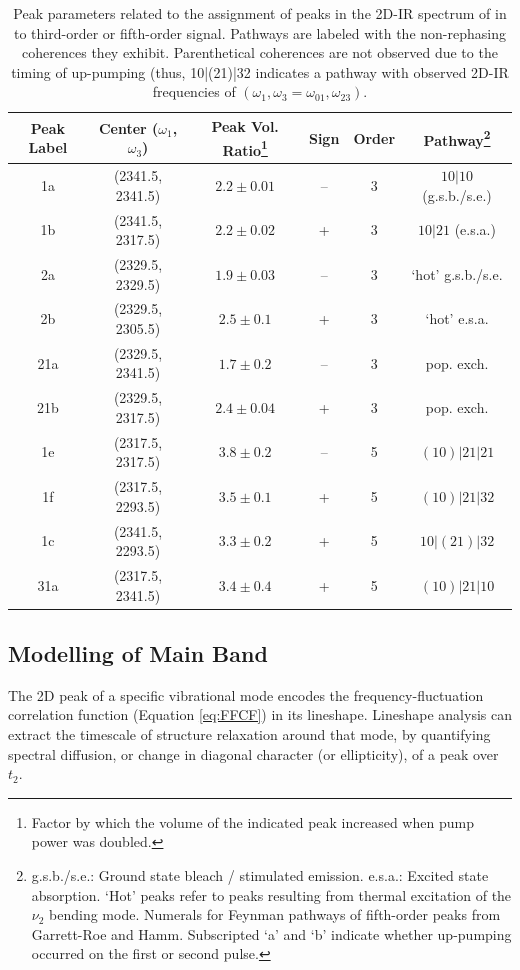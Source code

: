 \setlength{\tabcolsep}{0.4em}
\begin{table}
\caption[Assignment of CO2 features to 3rd or 5th order]{\label{tab:fifth_order}Peak parameters related to the assignment of peaks in the 2D-IR spectrum of  in \ce{[Im_{4,1}][TFA]} to third-order or fifth-order signal. Pathways are labeled with the non-rephasing coherences they exhibit. Parenthetical coherences are not observed due to the timing of up-pumping (thus, 10|(21)|32 indicates a pathway with observed 2D-IR frequencies of $(\omega_1,\omega_3 = \omega_{01},\omega_{23})$.}
		\begin{tabular}{c c c c c c}%
		\hline
Peak Label & Center ($\omega_1$, $\omega_3$)& Peak Vol. Ratio\footnote{Factor by which the volume of the indicated peak increased when pump power was doubled.}  & Sign & Order & Pathway\footnote{g.s.b./s.e.: Ground state bleach / stimulated emission. e.s.a.: Excited state absorption. `Hot' peaks refer to peaks resulting from thermal excitation of the $\nu_2$ bending mode. Numerals for Feynman pathways of fifth-order peaks from Garrett-Roe and Hamm.\cite{Garrett-Roe2009b} Subscripted `a' and `b' indicate whether up-pumping occurred on the first or second pulse.} \\
\hline
1a & (2341.5, 2341.5) &$2.2 \pm 0.01$ & -- & 3 & $10|10$ (g.s.b./s.e.)  \\
1b & (2341.5, 2317.5)&$2.2 \pm 0.02$ & + & 3 & $10|21$ (e.s.a.)   \\
2a & (2329.5, 2329.5) &$1.9 \pm 0.03$ & -- & 3  & `hot' g.s.b./s.e. \\
2b & (2329.5, 2305.5) &$2.5 \pm 0.1$ & + & 3  & `hot' e.s.a.  \\
21a & (2329.5, 2341.5) & $1.7 \pm 0.2$ & --& 3  & pop. exch. \\
21b & (2329.5, 2317.5) & $2.4 \pm 0.04$ & + & 3 & pop. exch. \\
1e & (2317.5, 2317.5) & $3.8 \pm 0.2$ & -- & 5 & $\left(10\right)|21|21$ \\
1f & (2317.5, 2293.5) & $3.5 \pm 0.1$ & + & 5  & $\left(10\right)|21|32$ \\
1c & (2341.5, 2293.5) & $3.3 \pm 0.2$ & + &5 & $10|\left(21\right)|32$  \\
31a & (2317.5, 2341.5) &$3.4 \pm 0.4$ & + & 5 & $\left(10\right)|21|10$ \\
		\end{tabular}
\end{table}

\subsection{Modelling of Main Band}
\label{sec:anions_2DIR_analysis}
The 2D peak of a specific vibrational mode encodes the frequency-fluctuation correlation function (Equation \ref{eq:FFCF}) in its lineshape. Lineshape analysis can extract the timescale of structure relaxation around that mode, by quantifying spectral diffusion, or change in diagonal character (or ellipticity), of a peak over $t_2$.

